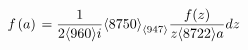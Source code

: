 

    \[\let\par\empty

    
{
f
{\left.
\middle(
a
\middle)
\right.}
=
{\frac{{1}}{{
{2}
\unicode{960}
i
}}}
{{\unicode{8750}}\sb{{
\unicode{947}
}}}
{\frac{{\left.
f
\middle(
z
\middle)
\right.}}{{
z
\unicode{8722}
a
}}}
d
z
}


    \]

  